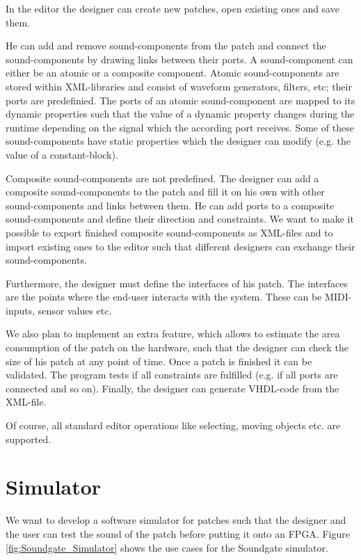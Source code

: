 In the editor the designer can create new patches, open existing ones and save them.

He can add and remove sound-components from the patch and connect the sound-components by drawing links between their ports.
A sound-component can either be an atomic or a composite component. 
Atomic sound-components are stored within XML-libraries and consist of waveform generators, filters, etc; their ports are predefinied. 
The ports of an atomic sound-component are mapped to its dynamic properties such that the value of a dynamic property changes during the runtime depending on the signal which the according port receives.  
Some of these sound-components have static properties which the designer can modify (e.g. the value of a constant-block). 

Composite sound-components are not predefined. 
The designer can add a composite sound-components to the patch and fill it on his own with other sound-components and links between them. 
He can add ports to a composite sound-components and define their direction and constraints. 
We want to make it possible to export finished composite sound-components as XML-files and to import existing ones to the editor such that different designers can exchange their sound-components.


Furthermore, the designer must define the interfaces of his patch. 
The interfaces are the points where the end-user interacts with the system. 
These can be MIDI-inputs, sensor values etc.

We also plan to implement an extra feature, which allows to estimate the area consumption of the patch on the hardware, such that the designer can check the size of his patch at any point of time. 
Once a patch is finished it can be validated. The program tests if all constraints are fulfilled (e.g. if all ports are connected and so on). Finally, the designer can generate VHDL-code from the XML-file.

Of course, all standard editor operations like selecting, moving objects etc. are supported.

\section{Simulator}

We want to develop a software simulator for patches such that the designer and the user can test the sound of the patch before putting it onto an \ac{FPGA}. Figure \ref{fig:Soundgate_Simulator} shows the use cases for the Soundgate simulator.

